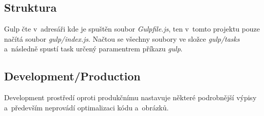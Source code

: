 \documentclass[a4paper,12pt,twoside,BCOR=10mm]{article}
\renewcommand{\it}[1]{\textit{#1}}    %
\begin{document}
\subsection{Struktura}
Gulp čte v~adresáři kde je spuštěn soubor \it{Gulpfile.js}, ten v~tomto projektu pouze načítá soubor \it{gulp/index.js}. Načtou se všechny soubory ve složce \it{gulp/tasks} a~následně spustí task určený paramentrem příkazu \it{gulp}.

\subsection{Development/Production}
Development prostředí oproti produkčnímu nastavuje některé podrobnější výpisy a~především neprovádí optimalizaci kódu a~obrázků.\\
\end{document}
